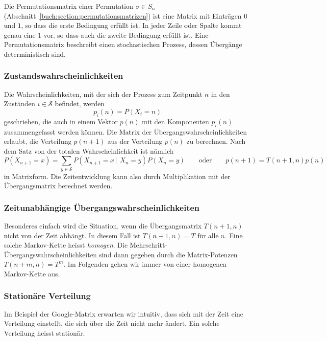 \begin{beispiel}
Die Permutationsmatrix einer Permutation $\sigma\in S_n$ 
(Abschnitt~\ref{buch:section:permutationsmatrizen})
%
ist eine Matrix mit Einträgen $0$ und $1$, so dass die erste Bedingung
erfüllt ist.
In jeder Zeile oder Spalte kommt genau eine $1$ vor, so dass auch die
zweite Bedingung erfüllt ist.
Eine Permutationsmatrix beschreibt einen stochastischen Prozess, dessen
Übergänge deterministisch sind.
\end{beispiel}

\subsubsection{Zustandswahrscheinlichkeiten}
Die Wahrscheinlichkeiten, mit der sich der Prozess zum Zeitpunkt $n$
in den Zuständen $i\in\mathcal{S}$ befindet, werden
\[
p_i(n)
=
P(X_i=n)
\]
geschrieben, die auch in einem Vektor $p(n)$ mit den Komponenten
$p_i(n)$ zusammengefasst werden können.
Die Matrix der Übergangswahrscheinlichkeiten erlaubt, die Verteilung
$p(n+1)$ aus der Verteilung $p(n)$ zu berechnen.
Nach dem Satz von der totalen Wahrscheinlichkeit ist nämlich
\[
P(X_{n+1}=x)
=
\sum_{y\in\mathcal{S}} 
P(X_{n+1}=x\mid X_n=y) P(X_n=y)
\qquad\text{oder}\qquad
p(n+1) = T(n+1,n) p(n)
\]
in Matrixform.
Die Zeitentwicklung kann also durch Multiplikation mit der Übergangsmatrix
berechnet werden.

\subsubsection{Zeitunabhängige Übergangswahrscheinlichkeiten}
Besonderes einfach wird die Situation, wenn die Übergangsmatrix $T(n+1,n)$
nicht von der Zeit abhängt.
In diesem Fall ist $T(n+1,n) = T$ für alle $n$.
Eine solche Markov-Kette heisst {\em homogen}.
%
Die Mehrschritt-Übergangswahrscheinlichkeiten sind dann gegeben
durch die Matrix-Potenzen $T(n+m,n)=T^m$.
Im Folgenden gehen wir immer von einer homogenen Markov-Kette aus.

\subsubsection{Stationäre Verteilung}
Im Beispiel der Google-Matrix erwarten wir intuitiv, dass sich mit
der Zeit eine Verteilung einstellt,  die sich über die Zeit nicht
mehr ändert.
Ein solche Verteilung heisst stationär.

